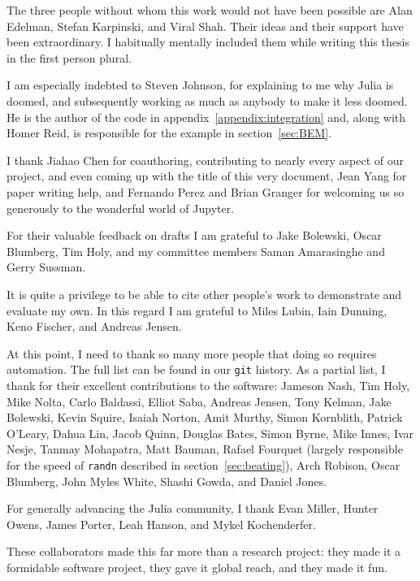 The three people without whom this work would not have been possible
are Alan Edelman, Stefan Karpinski, and Viral Shah.
Their ideas and their support have been extraordinary.
I habitually mentally included them while writing this thesis in the first
person plural.

I am especially indebted to Steven Johnson, for
explaining to me why Julia is doomed, and subsequently working as much as
anybody to make it less doomed.
He is the author of the code in appendix~\ref{appendix:integration} and,
along with Homer Reid, is responsible for the example in section~\ref{sec:BEM}.

I thank Jiahao Chen for coauthoring, contributing to nearly
every aspect of our project,
and even coming up with the title of this very document,
Jean Yang for paper writing help, and
Fernando Perez and Brian Granger for welcoming us so generously to the wonderful
world of Jupyter.

For their valuable feedback on drafts I am grateful to
Jake Bolewski, Oscar Blumberg, Tim Holy, and my committee members
Saman Amarasinghe and Gerry Sussman.

It is quite a privilege to be able to cite other people's work to
demonstrate and evaluate my own.
In this regard I am grateful to Miles Lubin, Iain Dunning, Keno Fischer,
and Andreas Jensen.

At this point, I need to thank so many more people that doing so requires
automation.
The full list can be found in our \texttt{git} history.
As a partial list, I thank for their excellent contributions to the
software:
Jameson Nash,
Tim Holy,
Mike Nolta,
Carlo Baldassi,
Elliot Saba,
Andreas Jensen,
Tony Kelman,
Jake Bolewski,
Kevin Squire,
Isaiah Norton,
Amit Murthy,
Simon Kornblith,
Patrick O'Leary,
Dahua Lin,
Jacob Quinn,
Douglas Bates,
Simon Byrne,
Mike Innes,
Ivar Nesje,
Tanmay Mohapatra,
Matt Bauman,
Rafael Fourquet (largely responsible for the speed of \texttt{randn}
described in section~\ref{sec:beating}),
Arch Robison,
Oscar Blumberg,
John Myles White,
Shashi Gowda,
and Daniel Jones.

For generally advancing the Julia community, I thank
Evan Miller, Hunter Owens, James Porter, Leah Hanson, and
Mykel Kochenderfer.

These collaborators made this far more than a research project: they
made it a formidable software project, they gave it global reach, and they
made it fun.
